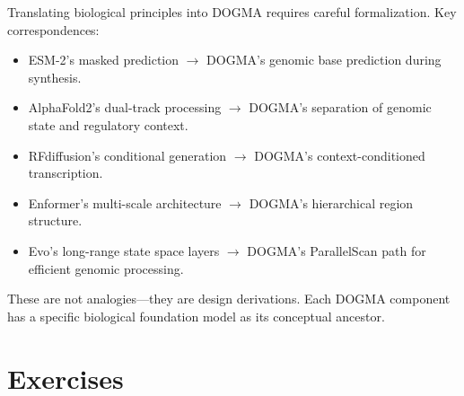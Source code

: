 \begin{implnote}
Translating biological principles into DOGMA requires careful formalization. Key correspondences:
\begin{itemize}[leftmargin=1.5em]
  \item ESM-2's masked prediction $\longrightarrow$ DOGMA's genomic base prediction during synthesis.
  \item AlphaFold2's dual-track processing $\longrightarrow$ DOGMA's separation of genomic state and regulatory context.
  \item RFdiffusion's conditional generation $\longrightarrow$ DOGMA's context-conditioned transcription.
  \item Enformer's multi-scale architecture $\longrightarrow$ DOGMA's hierarchical region structure.
  \item Evo's long-range state space layers $\longrightarrow$ DOGMA's ParallelScan path for efficient genomic processing.
\end{itemize}
These are not analogies---they are design derivations. Each DOGMA component has a specific biological foundation model as its conceptual ancestor.
\end{implnote}

\section{Exercises}
\label{sec:ch6-exercises}

